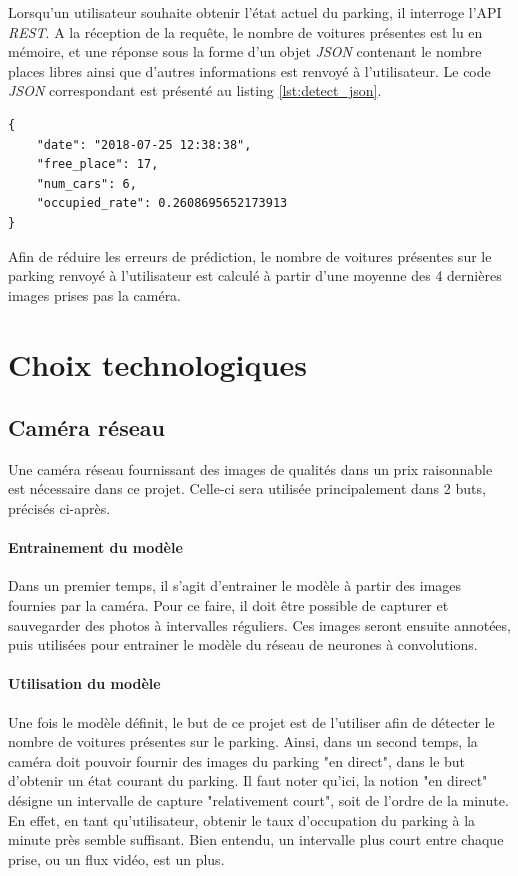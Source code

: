 Lorsqu'un utilisateur souhaite obtenir l'état actuel du parking, il interroge l'API \textit{REST}. A la réception de la requête, le nombre de voitures présentes est lu en mémoire, et une réponse sous la forme d'un objet \textit{JSON} contenant le nombre places libres ainsi que d'autres informations est renvoyé à l'utilisateur. Le code \textit{JSON} correspondant est présenté au listing \ref{lst:detect_json}.

\begin{lstlisting}[caption={\textit{JSON} reçu par l'utilisateur}, label={lst:detect_json}] 
{
    "date": "2018-07-25 12:38:38", 
    "free_place": 17, 
    "num_cars": 6, 
    "occupied_rate": 0.2608695652173913
}
\end{lstlisting}

Afin de réduire les erreurs de prédiction, le nombre de voitures présentes sur le parking renvoyé à l'utilisateur est calculé à partir d'une moyenne des 4 dernières images prises pas la caméra.


\section{Choix technologiques}

\subsection{Caméra réseau}\label{conception.techno.camera}
Une caméra réseau fournissant des images de qualités dans un prix raisonnable est nécessaire dans ce projet. Celle-ci sera utilisée principalement dans 2 buts, précisés ci-après.

\paragraph{Entrainement du modèle}
Dans un premier temps, il s'agit d'entrainer le modèle à partir des images fournies par la caméra. Pour ce faire, il doit être possible de capturer et sauvegarder des photos à intervalles réguliers. Ces images seront ensuite annotées, puis utilisées pour entrainer le modèle du réseau de neurones à convolutions. 

\paragraph{Utilisation du modèle}
Une fois le modèle définit, le but de ce projet est de l'utiliser afin de détecter le nombre de voitures présentes sur le parking. Ainsi, dans un second temps, la caméra doit pouvoir fournir des images du parking "en direct", dans le but d'obtenir un état courant du parking. Il faut noter qu'ici, la notion "en direct" désigne un intervalle de capture "relativement court", soit de l'ordre de la minute. En effet, en tant qu'utilisateur, obtenir le taux d'occupation du parking à la minute près semble suffisant. Bien entendu, un intervalle plus court entre chaque prise, ou un flux vidéo, est un plus.

